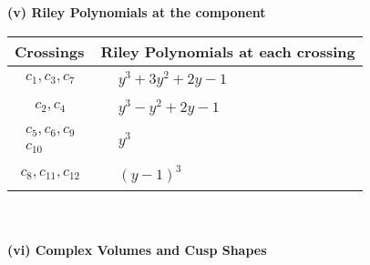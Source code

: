 \documentclass[1p]{elsarticle_modified}
\theoremstyle{definition}
\begin{document}
\newpage\renewcommand{\arraystretch}{1}
\flushleft \textbf{(v) Riley Polynomials at the component}\newline \\
\begin{tabular}{m{50pt}|m{274pt}}
Crossings & \hspace{64pt}Riley Polynomials at each crossing \\
\hline $$\begin{aligned}c_{1},c_{3},c_{7}\end{aligned}$$&$\begin{aligned}
&y^3+3 y^2+2 y-1
\end{aligned}$\\
\hline $$\begin{aligned}c_{2},c_{4}\end{aligned}$$&$\begin{aligned}
&y^3- y^2+2 y-1
\end{aligned}$\\
\hline $$\begin{aligned}c_{5},c_{6},c_{9}\\c_{10}\end{aligned}$$&$\begin{aligned}
&y^3
\end{aligned}$\\
\hline $$\begin{aligned}c_{8},c_{11},c_{12}\end{aligned}$$&$\begin{aligned}
&(y-1)^3
\end{aligned}$\\
\hline
\end{tabular}\\~\\
\newpage\flushleft \textbf{(vi) Complex Volumes and Cusp Shapes}
\end{document}
